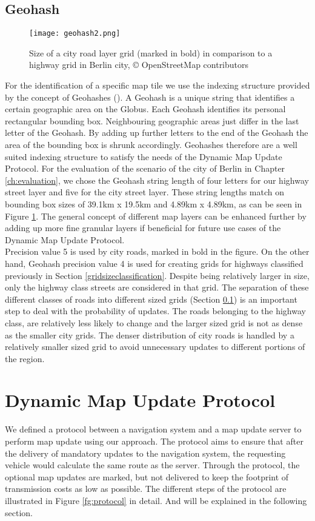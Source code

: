 \subsection{Geohash}\label{geohashsizes}
\begin{figure}
\texttt{[image: geohash2.png]}
\caption{Size of a city road layer grid (marked in bold) in comparison to a highway grid in Berlin city, {\copyright} OpenStreetMap contributors}
\label{fg:geohash}
\end{figure}
For the identification of a specific map tile we use the indexing structure provided by the concept of Geohashes (\citet{suwardi2015geohash}). A Geohash is a unique string that identifies a certain geographic area on the Globus. Each Geohash identifies its personal rectangular bounding box. Neighbouring geographic areas just differ in the last letter of the Geohash. By adding up further letters to the end of the Geohash the area of the bounding box is shrunk accordingly. Geohashes therefore are a well suited indexing structure to satisfy the needs of the Dynamic Map Update Protocol. For the evaluation of the scenario of the city of Berlin in Chapter \ref{ch:evaluation}, we chose the Geohash string length of four letters for our highway street layer and five for the city street layer. These string lengths match on bounding box sizes of 39.1km x 19.5km and 4.89km x 4.89km, as can be seen in Figure \ref{fg:geohash}. The general concept of different map layers can be enhanced further by adding up more fine granular layers if beneficial for future use cases of the Dynamic Map Update Protocol. \\

Precision value 5 is used by city roads, marked in bold in the figure. On the other hand, Geohash precision value 4 is used for creating grids for highways classified previously in Section \ref{gridsizeclassification}. Despite being relatively larger in size, only the highway class streets are considered in that grid. The separation of these different classes of roads into different sized grids (Section \ref{geohashsizes}) is an important step to deal with the probability of updates. The roads belonging to the highway class, are relatively less likely to change and the larger sized grid is not as dense as the smaller city grids. The denser distribution of city roads is handled by a relatively smaller sized grid to avoid unnecessary updates to different portions of the region. 

\section{Dynamic Map Update Protocol}\label{protocol}
We defined a protocol between a navigation system and a map update server to perform map update using our approach. The protocol aims to ensure that after the delivery of mandatory updates to the navigation system, the requesting vehicle would calculate the same route as the server. Through the protocol, the optional map updates are marked, but not delivered to keep the footprint of transmission costs as low as possible. The different steps of the protocol are illustrated in Figure \ref{fg:protocol} in detail. And will be explained in the following section.


